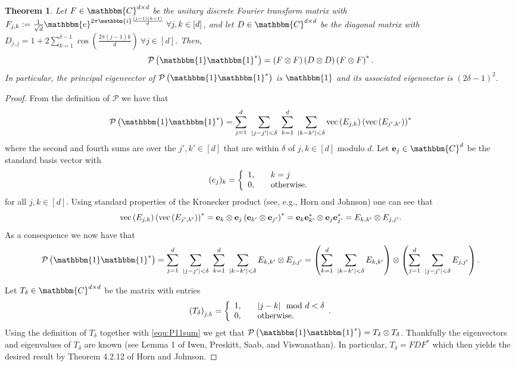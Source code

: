 \documentclass[]{spie}  %
\newtheorem{thm}{Theorem}
\def \one { \mathbbm{1}}
\def \e { \mathbbm{e}}
\def \i { \mathbbm{i}}
\begin{document}
\begin{thm} 
Let $F \in \mathbbm{C}^{d \times d}$ be the unitary discrete Fourier transform matrix with $F_{j,k} := \frac{1}{\sqrt{d}} \e^{2 \pi \i \frac{(j-1)(k-1)}{d}} ~\forall j,k \in [d]$, and let $D \in \mathbbm{C}^{d \times d}$ be the diagonal matrix with $D_{j,j} = 1 + 2 \sum^{\delta-1}_{k=1} \cos \left( \frac{2 \pi (j-1)k}{d} \right)~\forall j \in [d]$.  Then,
$$\mathcal{P} \left( \one \one^* \right) = \left( F \otimes F \right) \left( D \otimes D \right) \left( F \otimes F \right)^*.$$
In particular, the principal eigenvector of $\mathcal{P} \left( \one \one^* \right)$ is $\one$ and its associated eigenvector is $(2 \delta - 1)^2$. 
\label{thm:Factorized_P11}
\end{thm}

\begin{proof}
From the definition of $\mathcal{P}$ we have that 
$$\mathcal{P} \left( \one \one^* \right) = \sum^d_{j=1} ~\sum_{|j - j'| < \delta} ~\sum^d_{k=1} ~\sum_{|k - k'| < \delta}{\rm vec} \left( E_{j,k} \right) \left({\rm vec} \left( E_{j',k'} \right) \right)^*$$
where the second and fourth sums are over the $j',k' \in [d]$ that are within $\delta$ of $j,k \in [d]$ modulo $d$.  Let ${\bf e}_j \in \mathbbm{C}^d$ be the standard basis vector with
\[(e_{j})_k = \left\{\begin{array}{r@{,\qquad}l} 1 & k=j  \\ 0 & \text{otherwise}. \end{array}\right.\] 
for all $j,k \in [d]$.  Using standard properties of the Kronecker product (see, e.g., Horn and Johnson\cite{horn1991topics}) one can see that
$${\rm vec}\left( E_{j,k} \right) \left({\rm vec} \left( E_{j',k'} \right) \right)^* = {\bf e}_k \otimes {\bf e}_j \left(  {\bf e}_{k'} \otimes {\bf e}_{j'} \right)^* = {\bf e}_k {\bf e}_{k'}^* \otimes {\bf e}_j{\bf e}_{j'}^* = E_{k,k'} \otimes E_{j,j'}.$$
As a consequence we now have that
\begin{equation}
\mathcal{P} \left( \one \one^* \right) = \sum^d_{j=1} ~\sum_{|j - j'| < \delta} ~\sum^d_{k=1} ~\sum_{|k - k'| < \delta} E_{k,k'} \otimes E_{j,j'} = \left( \sum^d_{k=1} ~\sum_{|k - k'| < \delta} E_{k,k'} \right) \otimes \left( \sum^d_{j=1} ~\sum_{|j - j'| < \delta} E_{j,j'}\right).
\label{equ:P11sum}
\end{equation}

Let $T_\delta \in \mathbbm{C}^{d \times d}$ be the matrix with entries 
\[\left(T_\delta\right)_{j,k} = \left\{\begin{array}{r@{,\qquad}l} 1 & |j - k| \mod d < \delta \\ 0 & \text{otherwise}. \end{array}.\right.\] 
Using the definition of $T_\delta$ together with \eqref{equ:P11sum} we get that $\mathcal{P} \left( \one \one^* \right) = T_\delta \otimes T_\delta$.  Thankfully the eigenvectors and eigenvalues of $T_\delta$ are known (see Lemma 1 of Iwen, Preskitt, Saab, and Viswanathan\cite{iwen2016phase}).  In particular, $T_\delta = F D F^*$ which then yields the desired result by Theorem 4.2.12 of Horn and Johnson\cite{horn1991topics}.
\end{proof}
\end{document}
